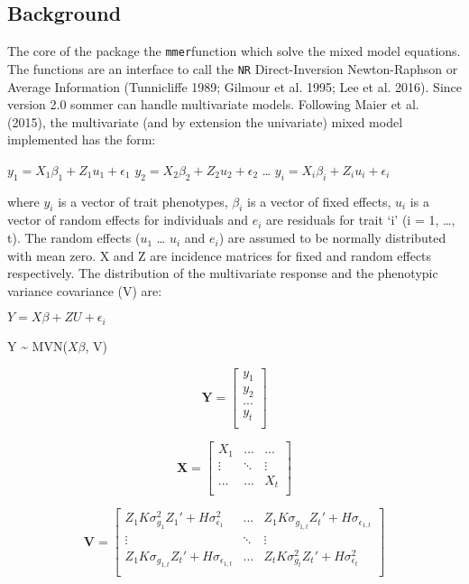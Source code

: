\documentclass[]{article}
\begin{document}
\subsection{Background}\label{background}

The core of the package the \texttt{mmer}function which solve the mixed
model equations. The functions are an interface to call the \texttt{NR}
Direct-Inversion Newton-Raphson or Average Information (Tunnicliffe
1989; Gilmour et al. 1995; Lee et al. 2016). Since version 2.0 sommer
can handle multivariate models. Following Maier et al. (2015), the
multivariate (and by extension the univariate) mixed model implemented
has the form:

\(y_1 = X_1\beta_1 + Z_1u_1 + \epsilon_1\)
\(y_2 = X_2\beta_2 + Z_2u_2 + \epsilon_2\) \ldots{}
\(y_i = X_i\beta_i + Z_iu_i + \epsilon_i\)

where \(y_i\) is a vector of trait phenotypes, \(\beta_i\) is a vector
of fixed effects, \(u_i\) is a vector of random effects for individuals
and \(e_i\) are residuals for trait `i' (i = 1, \ldots{}, t). The random
effects (\(u_1\) \ldots{} \(u_i\) and \(e_i\)) are assumed to be
normally distributed with mean zero. X and Z are incidence matrices for
fixed and random effects respectively. The distribution of the
multivariate response and the phenotypic variance covariance (V) are:

\(Y = X\beta + ZU + \epsilon_i\)

Y \textasciitilde{} MVN(\(X\beta\), V)

\[\mathbf{Y} = \left[\begin{array}
{r}
y_1 \\
y_2 \\
... \\
y_t \\
\end{array}\right]
\]

\[\mathbf{X} = \left[\begin{array}
{rrr}
X_1 & ... & ... \\
\vdots & \ddots & \vdots\\
... & ... & X_t \\
\end{array}\right]
\]

\[\mathbf{V} = \left[\begin{array}
{rrr}
Z_1 K{\sigma^2_{g_{1}}} Z_1' + H{\sigma^2_{\epsilon_{1}}} & ... & Z_1 K{\sigma_{g_{1,t}}} Z_t' + H{\sigma_{\epsilon_{1,t}}}\\
 \vdots & \ddots & \vdots\\
Z_1 K{\sigma_{g_{1,t}}} Z_t' + H{\sigma_{\epsilon_{1,t}}} & ... & Z_t K{\sigma^2_{g_{t}}} Z_t' + H{\sigma^2_{\epsilon_{t}}} \\
\end{array}\right]
\]
\end{document}
